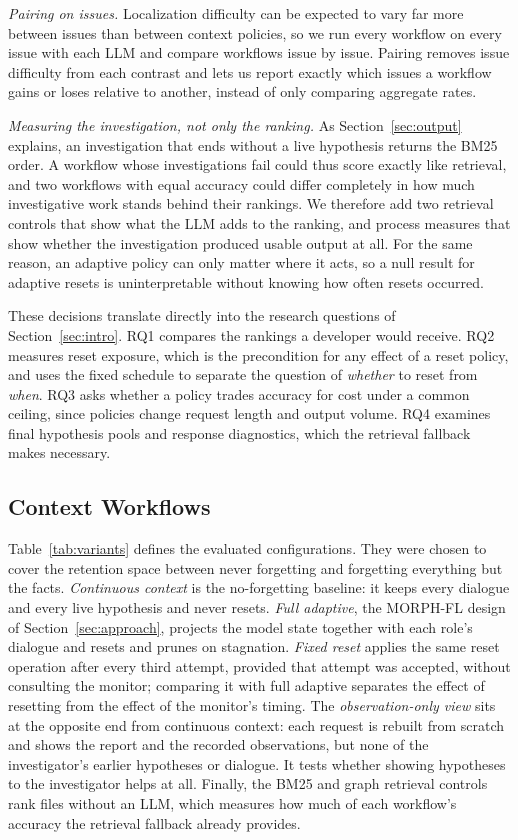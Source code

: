\documentclass[a4paper,fleqn]{cas-sc}
\newcommand{\tool}{MORPH-FL}
\begin{document}
\emph{Pairing on issues.} Localization difficulty can be expected to vary far more between issues than between context policies, so we run every workflow on every issue with each LLM and compare workflows issue by issue. Pairing removes issue difficulty from each contrast and lets us report exactly which issues a workflow gains or loses relative to another, instead of only comparing aggregate rates.

\emph{Measuring the investigation, not only the ranking.} As Section~\ref{sec:output} explains, an investigation that ends without a live hypothesis returns the BM25 order. A workflow whose investigations fail could thus score exactly like retrieval, and two workflows with equal accuracy could differ completely in how much investigative work stands behind their rankings. We therefore add two retrieval controls that show what the LLM adds to the ranking, and process measures that show whether the investigation produced usable output at all. For the same reason, an adaptive policy can only matter where it acts, so a null result for adaptive resets is uninterpretable without knowing how often resets occurred.

These decisions translate directly into the research questions of Section~\ref{sec:intro}. RQ1 compares the rankings a developer would receive. RQ2 measures reset exposure, which is the precondition for any effect of a reset policy, and uses the fixed schedule to separate the question of \emph{whether} to reset from \emph{when}. RQ3 asks whether a policy trades accuracy for cost under a common ceiling, since policies change request length and output volume. RQ4 examines final hypothesis pools and response diagnostics, which the retrieval fallback makes necessary.

\subsection{Context Workflows}\label{sec:variants}
Table~\ref{tab:variants} defines the evaluated configurations. They were chosen to cover the retention space between never forgetting and forgetting everything but the facts. \emph{Continuous context} is the no-forgetting baseline: it keeps every dialogue and every live hypothesis and never resets. \emph{Full adaptive}, the \tool{} design of Section~\ref{sec:approach}, projects the model state together with each role's dialogue and resets and prunes on stagnation. \emph{Fixed reset} applies the same reset operation after every third attempt, provided that attempt was accepted, without consulting the monitor; comparing it with full adaptive separates the effect of resetting from the effect of the monitor's timing. The \emph{observation-only view} sits at the opposite end from continuous context: each request is rebuilt from scratch and shows the report and the recorded observations, but none of the investigator's earlier hypotheses or dialogue. It tests whether showing hypotheses to the investigator helps at all. Finally, the BM25 and graph retrieval controls rank files without an LLM, which measures how much of each workflow's accuracy the retrieval fallback already provides.
\end{document}
